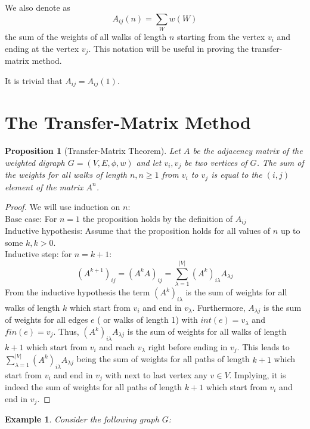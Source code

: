 \documentclass[12pt]{report}
\newtheorem{prop}{Proposition}
\newtheorem{exa}[mythm]{Example}
\begin{document}
{\noindent We also denote as \[A_{ij}(n)=\sum_W w(W)\] the sum of the weights of all walks of length $n$ starting from the vertex $v_i$ and ending at the vertex $v_j$. This notation will be useful in proving the transfer-matrix method.

\noindent It is trivial that $A_{ij}=A_{ij}(1)$.

\section{The Transfer-Matrix Method}


\begin{prop}[Transfer-Matrix Theorem]
Let $A$ be the adjacency matrix of the weighted digraph $G=(V,E,\phi,w)$ and let $v_i, v_j$ be two vertices of $G$. The sum of the weights for all walks of length $n,n\geq1$ from $v_i$ to $v_j$ is equal to the $(i,j)$ element of the matrix $A^n$.
\end{prop}
\begin{proof}
We will use induction on $n$: \\
Base case: For $n=1$ the proposition holds by the definition of $A_{ij}$\\
Inductive hypothesis: Assume that the proposition holds for all values of $n$ up to some $k, k > 0$.\\
Inductive step: for $n=k+1$: \[(A^{k+1})_{ij}=(A^kA)_{ij}=\sum\limits_{\lambda = 1}^{|V|} (A^k)_{i \lambda } A_{\lambda j}\]
From the inductive hypothesis the term $(A^k)_{i \lambda }$ is the sum of weights for all walks of length $k$ which start from $v_i$ and end in $v_{\lambda}$. Furthermore, $A_{\lambda j}$ is the sum of weights for all edges $e$ ( or walks of length 1) with $int(e) = v_{\lambda}$ and $fin(e)=v_j$. Thus, $(A^k)_{i \lambda } A_{\lambda j}$ is the sum of weights for all walks of length $k+1$ which start from $v_i$ and reach $v_{\lambda}$ right before ending in $v_j$. This leads to $\sum\limits_{\lambda = 1}^{|V|} (A^k)_{i \lambda } A_{\lambda j}$ being the sum of weights for all paths of length $k+1$ which start from $v_i$ and end in $v_j$ with next to last vertex any $v \in V$. Implying, it is indeed the sum of weights for all paths of length $k+1$ which start from $v_i$ and end in $v_j$.
\end{proof}

\begin{exa} Consider the following graph $G$:
\end{exa}

\begin{figure}[ht]\centering
\begin{tikzpicture}[shorten >=1pt,node distance=3.8cm,on grid,auto]
	

\end{tikzpicture}
\end{figure}}
\end{document}
